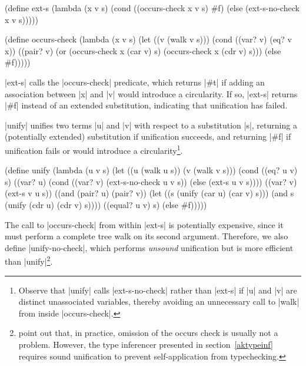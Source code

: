 \schemedisplayspace
\begin{schemedisplay}
(define ext-s
  (lambda (x v s)                                   
    (cond
      ((occurs-check x v s) #f)
      (else (ext-s-no-check x v s)))))

(define occurs-check
  (lambda (x v s)
    (let ((v (walk v s)))
      (cond
        ((var? v) (eq? v x))
        ((pair? v) (or (occurs-check x (car v) s) (occurs-check x (cdr v) s)))
        (else #f)))))
\end{schemedisplay}

\noindent \scheme|ext-s| calls the \scheme|occurs-check| predicate, which
returns \scheme|#t| if adding an association between \scheme|x| and
\scheme|v| would introduce a circularity.  If so, \scheme|ext-s|
returns \scheme|#f| instead of an extended substitution, indicating
that unification has failed.

\scheme|unify| unifies two terms \scheme|u| and \scheme|v| with
respect to a substitution \scheme|s|, returning a (potentially
extended) substitution if unification succeeds, and returning
\scheme|#f| if unification fails or would introduce a
circularity\footnote{Observe that \scheme|unify| calls
\scheme|ext-s-no-check| rather than \scheme|ext-s| if \scheme|u| and
\scheme|v| are distinct unassociated variables, thereby avoiding an
unnecessary call to \scheme|walk| from inside
\scheme|occurs-check|.}.

\schemedisplayspace
\begin{schemedisplay}
(define unify
  (lambda (u v s)
    (let ((u (walk u s))
          (v (walk v s)))
      (cond
        ((eq? u v) s)
        ((var? u) 
         (cond
           ((var? v) (ext-s-no-check u v s))
           (else (ext-s u v s))))
        ((var? v) (ext-s v u s))
        ((and (pair? u) (pair? v))
         (let ((s (unify (car u) (car v) s)))
           (and s (unify (cdr u) (cdr v) s))))
        ((equal? u v) s)
        (else #f)))))
\end{schemedisplay}

The call to \scheme|occurs-check| from within \scheme|ext-s| is
potentially expensive, since it must perform a complete tree walk on
its second argument.  Therefore, we also define \scheme|unify-no-check|, which
performs \emph{unsound} unification but is more efficient than
\scheme|unify|\footnote{\citet{occurcheck} point out that, in
  practice, omission of the occurs check is usually not a problem.
  However, the type inferencer presented in
  section~\ref{aktypeinf} requires sound unification to
  prevent self-application from typechecking.}.

